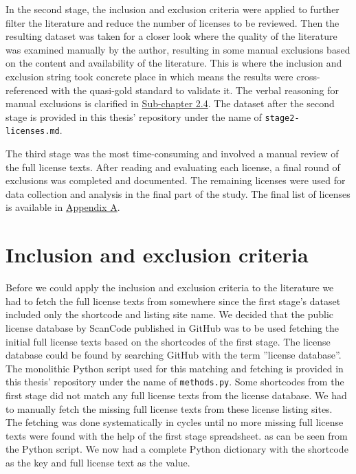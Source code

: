In the second stage, the inclusion and exclusion criteria were applied to further filter the literature and reduce the number of licenses to be reviewed. Then the resulting dataset was taken for a closer look where the quality of the literature was examined manually by the author, resulting in some manual exclusions based on the content and availability of the literature. This is where the inclusion and exclusion string took concrete place in which means the results were cross-referenced with the quasi-gold standard to validate it. The verbal reasoning for manual exclusions is clarified in \hyperref[incexc-criteria]{Sub-chapter 2.4}. The dataset after the second stage is provided in this thesis' repository \citep{mscthesis} under the name of \texttt{stage2-licenses.md}.

The third stage was the most time-consuming and involved a manual review of the full license texts. After reading and evaluating each license, a final round of exclusions was completed and documented. The remaining licenses were used for data collection and analysis in the final part of the study. The final list of licenses is available in \hyperref[appendix:a]{Appendix A}.

\section{Inclusion and exclusion criteria\label{incexc-criteria}}
Before we could apply the inclusion and exclusion criteria to the literature we had to fetch the full license texts from somewhere since the first stage's dataset included only the shortcode and listing site name. We decided that the public license database by ScanCode published in GitHub \citep{scancode} was to be used fetching the initial full license texts based on the shortcodes of the first stage. The license database could be found by searching GitHub with the term ''license database''. The monolithic Python script used for this matching and fetching is provided in this thesis' repository \citep{mscthesis} under the name of \texttt{methods.py}. Some shortcodes from the first stage did not match any full license texts from the license database. We had to manually fetch the missing full license texts from these license listing sites. The fetching was done systematically in cycles until no more missing full license texts were found with the help of the first stage spreadsheet. as can be seen from the Python script. We now had a complete Python dictionary with the shortcode as the key and full license text as the value.

